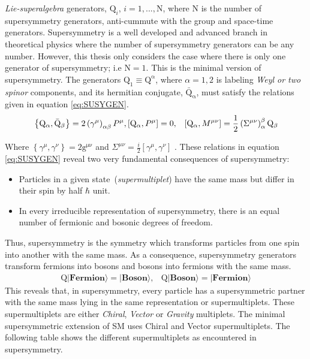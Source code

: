 \newline
\textit{Lie-superalgebra} generators, $\mathrm{Q}_{i}$, $i = 1,...,\mathrm{N}$, where $\mathrm{N}$ is the number of supersymmetry generators, anti-cummute with the group and space-time generators.  %
Supersymmetry is a well developed and advanced branch in theoretical physics where the number of supersymmetry generators can be any number. However, this thesis only considers the case where there is only one generator of supersymmetry; i.e $\mathrm{N} = 1$. This is the minimal  version of supersymmetry. 
 The generators $\mathrm{Q_{1}} \equiv \mathrm{Q^{\alpha}}$, where $\alpha=1,2$ is labeling \textit{Weyl or two spinor} components,  and its hermitian conjugate, $\mathrm{\bar{Q}_{\alpha}}$, must satisfy the relations given in equation \ref{eq:SUSYGEN}.
\begin{eqnarray}{\label{eq:SUSYGEN}}             
\left\lbrace\mathrm{Q_{\alpha}}, \mathrm{\bar{Q}_{\beta}}\right\rbrace =  2\left(\gamma^{\mu}\right)_{\alpha\beta}P^{\mu}, &
\left[\mathrm{Q_{\alpha}},P^{\mu}\right] = 0, &
\left[\mathrm{Q_{\alpha}}, M^{\mu\nu}\right] =\frac{1}{2}\left(\Sigma^{\mu\nu}\right)_{\alpha}^{\beta}\mathrm{Q_{\beta}}
\end{eqnarray}

Where $\left\lbrace \gamma^{\mu}, \gamma^{\nu}\right\rbrace = 2\mathrm{g^{\mu\nu}}$ and  $\Sigma^{\mu\nu} = \frac{i}{2}\left[\gamma^{\mu},\gamma^{\nu}\right]$ 
. %
These relations in equation \ref{eq:SUSYGEN} reveal two very fundamental consequences of supersymmetry:
\begin{itemize}
\item  Particles in a given state~(\textit{supermultiplet}) have the same mass but differ in their spin by half $\hbar$ unit.
\item In every irreducible representation of supersymmetry, there is an equal number of fermionic and bosonic degrees of freedom. 
\end{itemize}
Thus, supersymmetry is the symmetry which transforms particles from one spin into another with the same mass. As a consequence, supersymmetry generators transform fermions into bosons and bosons into fermions with the same mass.
\begin{eqnarray}
\mathrm{Q}|\textbf{Fermion}\rangle =|\textbf{Boson}\rangle,    &
\mathrm{Q}|\textbf{Boson}\rangle  =|\textbf{Fermion} \rangle 
\end{eqnarray}
This reveals that, in supersymmetry, every particle has a supersymmetric partner with the same mass lying in the same representation or supermultiplets.
These supermultiplets are either \textit{Chiral}, \textit{Vector} or \textit{Gravity} multiplets. The minimal supersymmetric extension of SM uses Chiral and Vector supermultiplets. 
The following table shows the different supermultiplets as encountered in supersymmetry.

